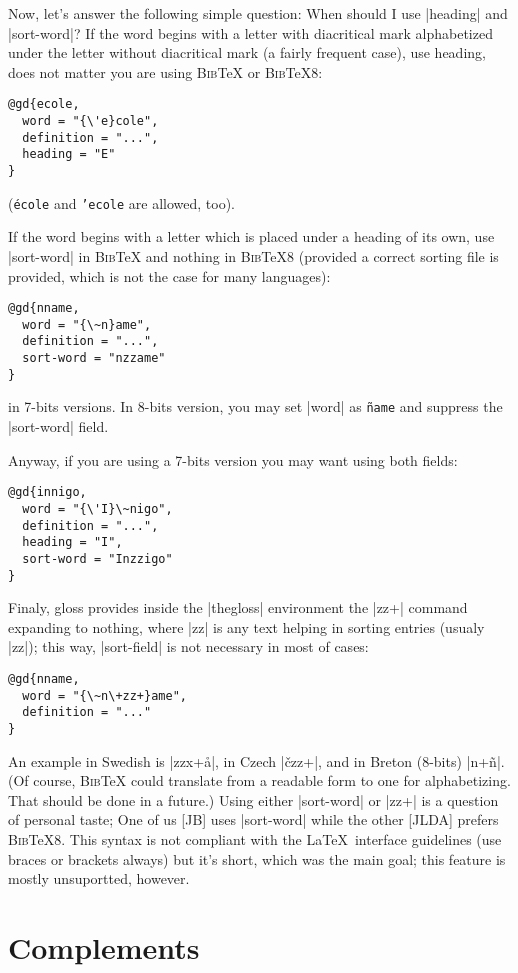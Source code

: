 \documentclass{ltxguide}
\newcommand{\bibTeX}{\textsc{Bib}\TeX}
\begin{document}
Now, let's answer the following simple question: When should I use 
|heading| and |sort-word|?  If the word begins with a letter with 
diacritical mark alphabetized under the letter without diacritical 
mark (a fairly frequent case), use heading, does not matter you are 
using \bibTeX{} or \bibTeX 8:
\begin{verbatim}
@gd{ecole,
  word = "{\'e}cole",
  definition = "...",
  heading = "E"
}
\end{verbatim}
(\texttt{\'ecole} and \texttt{{'e}cole} are allowed, too).

If the word begins with a letter which is placed under a heading of 
its own, use |sort-word| in \bibTeX{} and nothing in \bibTeX8 
(provided a correct sorting file is provided, which is not the case 
for many languages):
\begin{verbatim}
@gd{nname,
  word = "{\~n}ame",
  definition = "...",
  sort-word = "nzzame"
}
\end{verbatim}
in 7-bits versions.  In 8-bits version, you may set |word| as 
\texttt{\~name} and suppress the |sort-word| field.

Anyway, if you are using a 7-bits version you may want using both fields:
\begin{verbatim}
@gd{innigo,
  word = "{\'I}\~nigo",
  definition = "...",
  heading = "I",
  sort-word = "Inzzigo"
}
\end{verbatim}

Finaly, \textsf{gloss} provides inside the |thegloss| environment the 
|\+zz+| command expanding to nothing, where |zz| is any text helping 
in sorting entries (usualy |zz|); this way, |sort-field| is not 
necessary in most of cases:
\begin{verbatim}
@gd{nname,
  word = "{\~n\+zz+}ame",
  definition = "..."
}
\end{verbatim}
An example in Swedish is |\+zzx+\r{a}|, in Czech 
|{\v{c}\+zz+}|, and in Breton (8-bits) |\+n+\~n|.  (Of course, 
\bibTeX{} could translate from a readable form to one for 
alphabetizing.  That should be done in a future.) Using either 
|sort-word| or |\+zz+| is a question of personal taste; One of us [JB] 
uses |sort-word| while the other [JLDA] prefers 
\bibTeX8.  This syntax is not compliant with the \LaTeX\ interface 
guidelines (use braces or brackets always) but it's short, which was 
the main goal; this feature is mostly unsuportted, however.

\section{Complements}
\end{document}
